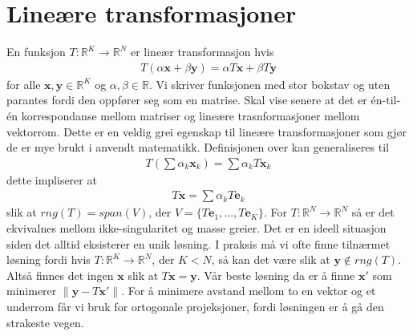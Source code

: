 \section{Lineære transformasjoner}
En funksjon $T:\mathbb{R}^K\rightarrow \mathbb{R}^N$ er lineær transformasjon hvis
\begin{align}
T(\alpha \mathbf{x} + \beta \mathbf{y}) = \alpha T \mathbf{x} + \beta T \mathbf{y}
\end{align}
for alle $\mathbf{x},\mathbf{y} \in \mathbb{R}^K$ og $\alpha,\beta \in \mathbb{R}$. Vi skriver funksjonen med stor bokstav og uten parantes fordi den oppfører seg som en matrise. Skal vise senere at det er én-til-én korrespondanse mellom matriser og lineære trasnformasjoner mellom vektorrom. Dette er en veldig grei egenskap til lineære transformasjoner som gjør de er mye brukt i anvendt matematikk. Definisjonen over kan generaliseres til
\begin{align}
T\left(\sum \alpha_k \mathbf{x}_k\right) =\sum \alpha_k T \mathbf{x}_k
\end{align}
dette impliserer at
\begin{align}
T\mathbf{x} = \sum \alpha_k T \mathbf{e}_k
\end{align}
slik at $rng(T) = span(V)$, der $V=\{T \mathbf{e}_1,..., T \mathbf{e}_K\}$. For $T:\mathbb{R}^N\rightarrow \mathbb{R}^N$ så er det ekvivalnes mellom ikke-singularitet og masse greier. Det er en ideell situasjon siden det alltid eksisterer en unik løsning. I praksis må vi ofte finne tilnærmet løsning fordi hvis $T:\mathbb{R}^K\rightarrow \mathbb{R}^N$, der $K<N$, så kan det være slik at $\mathbf{y} \notin rng(T)$. Altså finnes det ingen $\mathbf{x}$ slik at $T\mathbf{x} = \mathbf{y}$. Vår beste løsning da er å finne $\mathbf{x}'$ som minimerer $\|\mathbf{y}-T\mathbf{x}'\|$. For å minimere avstand mellom to en vektor og et underrom får vi bruk for ortogonale projeksjoner, fordi løsningen er å gå den strakeste vegen. 
